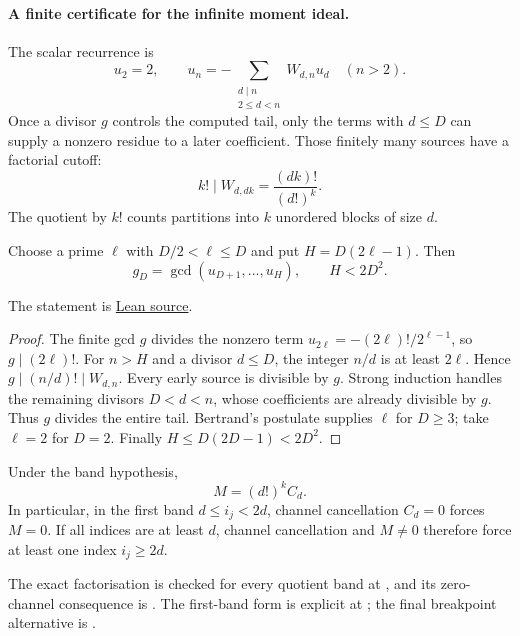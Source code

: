 \documentclass[11pt]{article}
\begin{document}
\paragraph{A finite certificate for the infinite moment ideal.}
The scalar recurrence is
\[
u_2=2,\qquad
u_n=-\sum_{\substack{d\mid n\\2\le d<n}}W_{d,n}u_d\quad(n>2).
\]
Once a divisor $g$ controls the computed tail, only the terms with
$d\le D$ can supply a nonzero residue to a later coefficient.
Those finitely many sources have a factorial cutoff:
\[
k!\mid W_{d,dk}=\frac{(dk)!}{(d!)^k}.
\]
The quotient by $k!$ counts partitions into $k$ unordered blocks of size $d$.

\begin{theorem}
\label{res:finite-channel-moment-certificate}
Choose a prime $\ell$ with $D/2<\ell\le D$ and put $H=D(2\ell-1)$.
Then
\[
g_D=\gcd(u_{D+1},\ldots,u_H),\qquad H<2D^2.
\]
\end{theorem}

\noindent The statement is
\href{https://github.com/wcook04/plectis-erdos/blob/f36a98bf3d3e6f65f1074e3b800e3293d5b8a51a/ErdosProblems/Erdos68/PaperCompleteMomentHorizon.lean#L252}{Lean source}.
\begin{proof}
The finite gcd $g$ divides the nonzero term
$u_{2\ell}=-(2\ell)!/2^{\ell-1}$, so $g\mid(2\ell)!$.
For $n>H$ and a divisor $d\le D$, the integer $n/d$ is at least $2\ell$.
Hence $g\mid(n/d)!\mid W_{d,n}$.  Every early source is divisible by $g$.
Strong induction handles the remaining divisors $D<d<n$, whose coefficients
are already divisible by $g$.  Thus $g$ divides the entire tail.
Bertrand's postulate supplies $\ell$ for $D\ge3$; take $\ell=2$ for $D=2$.
Finally $H\le D(2D-1)<2D^2$.
\end{proof}

\begin{theorem}
\label{res:bandbreakpoint}
Under the band hypothesis,
\[
  M=(d!)^k C_d.
\]
In particular, in the first band $d\le i_j<2d$, channel cancellation
$C_d=0$ forces $M=0$.  If all indices are at least $d$, channel cancellation
and $M\ne0$ therefore force at least one index $i_j\ge2d$.
\end{theorem}

\noindent The exact factorisation is checked for every quotient band at
,
and its zero-channel consequence is
.
The first-band form is explicit at
;
the final breakpoint alternative is
.
\end{document}

